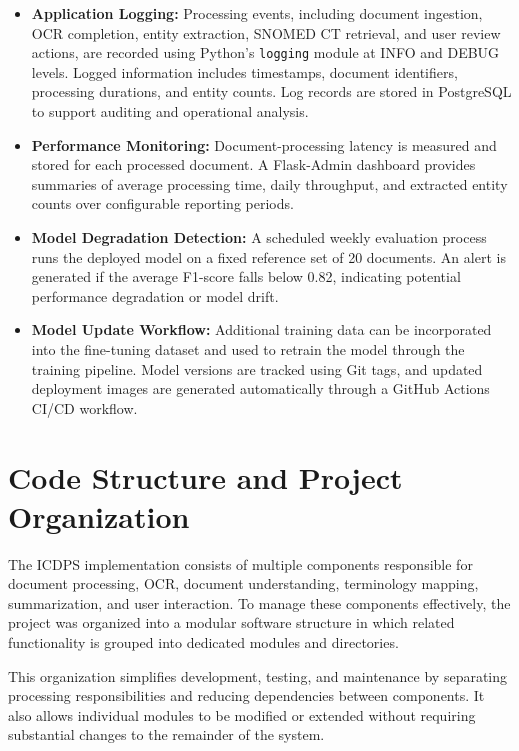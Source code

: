 \begin{itemize}

\item \textbf{Application Logging:} Processing events, including document ingestion, OCR completion, entity extraction, SNOMED CT retrieval, and user review actions, are recorded using Python's \texttt{logging} module at INFO and DEBUG levels. Logged information includes timestamps, document identifiers, processing durations, and entity counts. Log records are stored in PostgreSQL to support auditing and operational analysis.

\item \textbf{Performance Monitoring:} Document-processing latency is measured and stored for each processed document. A Flask-Admin dashboard provides summaries of average processing time, daily throughput, and extracted entity counts over configurable reporting periods.

\item \textbf{Model Degradation Detection:} A scheduled weekly evaluation process runs the deployed model on a fixed reference set of 20 documents. An alert is generated if the average F1-score falls below 0.82, indicating potential performance degradation or model drift.

\item \textbf{Model Update Workflow:} Additional training data can be incorporated into the fine-tuning dataset and used to retrain the model through the training pipeline. Model versions are tracked using Git tags, and updated deployment images are generated automatically through a GitHub Actions CI/CD workflow.

\end{itemize}

\section{Code Structure and Project Organization}

The ICDPS implementation consists of multiple components responsible for document processing, OCR, document understanding, terminology mapping, summarization, and user interaction. To manage these components effectively, the project was organized into a modular software structure in which related functionality is grouped into dedicated modules and directories.

This organization simplifies development, testing, and maintenance by separating processing responsibilities and reducing dependencies between components. It also allows individual modules to be modified or extended without requiring substantial changes to the remainder of the system.

